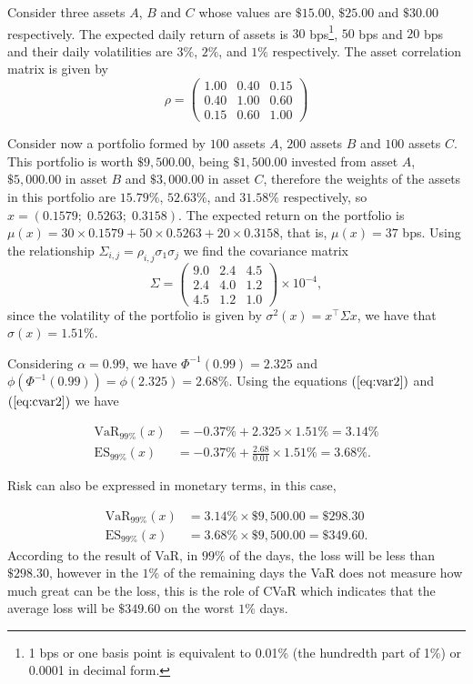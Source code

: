 \begin{example}\normalfont Consider three assets $A$, $B$ and $C$ whose values are $\$ 15.00$, $\$ 25.00$ and $\$ 30.00$ respectively. The expected daily return of assets is $30$ bps\footnote{1 bps or one basis point is equivalent to
0.01\% (the hundredth part of 1\%) or 0.0001 in decimal form.}, $50$ bps and $20$ bps and their daily volatilities are $3\%$, $2\%$, and $1\%$ respectively. The asset correlation matrix is given by
\[
\rho = \left(
\begin{array}{rrr}
1.00 & 0.40 & 0.15 \\
0.40 & 1.00 & 0.60 \\
0.15 & 0.60 & 1.00
\end{array}
\right)
\]

Consider now a portfolio formed by $100$ assets $A$, $200$ assets $B$ and $100$ assets $C$. This portfolio is worth $\$ 9,500.00$, being $\$ 1,500.00$ invested from asset $A$, $\$ 5,000.00$ in asset $B$ and $\$ 3,000.00$ in asset $C$, therefore the weights of the assets in this portfolio are $15.79\%$, $52.63\%$, and $31.58\%$ respectively, so $x=(0.1579;\;0.5263;\; 0.3158)$. The expected return on the portfolio is $\mu(x) = 30\times0.1579+50\times0.5263+20\times0.3158$, that is, $\mu(x) = 37$ bps. Using the relationship $\Sigma_{i,j}=\rho_{i,j}\sigma_1\sigma_j$ we find the covariance matrix 
\[
\Sigma = \left(
\begin{array}{llr}
9.0 & 2.4 & 4.5 \\
2.4 & 4.0 & 1.2 \\
4.5 & 1.2 & 1.0
\end{array}
\right)\times10^{-4},
\] since the volatility of the portfolio is given by
$\sigma^2(x) = x^\top \Sigma x$, we have that $\sigma(x) = 1.51\%$.

Considering $\alpha = 0.99%
$, we have $\Phi^{-1}(0.99) = 2.325$ and
$\phi(\Phi^{-1}(0.99))=\phi(2.325)=2.68\%$. Using the equations
$(\ref{eq:var2})$ and $(\ref{eq:cvar2})$ we have

\[
\begin{aligned}
\mathrm{VaR}_{99\%}(x) & = -0.37\% + 2.325 \times 1.51\% = 3.14\% \\
\mathrm{ES}_{99\%}(x) & = -0.37\% + \frac{2.68}{0.01} \times 1.51\% = 3.68\%.
\end{aligned}
\]

Risk can also be expressed in monetary terms, in this case,

\[
\begin{aligned}
\mathrm{VaR}_{99\%}(x) & = 3.14\% \times \$ 9,500.00 = \$ 298.30 \\
\mathrm{ES}_{99\%}(x) & = 3.68\% \times \$ 9,500.00 = \$ 349.60.
\end{aligned}
\]
According to the result of {\rm VaR}, in $99\%$ of the days, the loss will be less than $\$ 298.30$, however in the $1\%$ of the remaining days the {\rm VaR} does not measure how much great can be the loss, this is the role of {\rm CVaR} which indicates that the average loss will be $\$ 349.60$ on the worst $1\%$ days.
\end{example}



